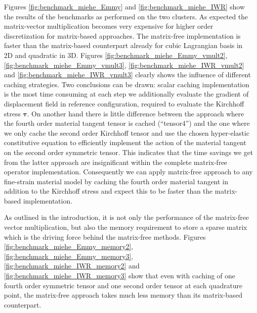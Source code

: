 \documentclass[preprint,12pt,times]{elsarticle}
\def\gz  #1{           \mbox{$\boldsymbol{#1}$}}
\begin{document}
Figures \ref{fig:benchmark_miehe_Emmy} and \ref{fig:benchmark_miehe_IWR} show the results of the benchmarks as performed on the two clusters.
As expected the matrix-vector multiplication becomes very expensive for higher order discretization for matrix-based approaches.
The matrix-free implementation is faster than the matrix-based counterpart already for cubic Lagrangian basis in 2D and quadratic in 3D.
Figures \ref{fig:benchmark_miehe_Emmy_vmult2}, \ref{fig:benchmark_miehe_Emmy_vmult3}, \ref{fig:benchmark_miehe_IWR_vmult2} and \ref{fig:benchmark_miehe_IWR_vmult3} clearly shows the influence of different caching strategies.
Two conclusions can be drawn: scalar caching implementation is the most time consuming at each step we additionally evaluate the gradient of displacement field in reference configuration, required to evaluate the Kirchhoff stress $\gz \tau$. On another hand there is little difference between the approach where the fourth order material tangent tensor is cached (``tensor4'') and the one where we only cache the second order Kirchhoff tensor and use the chosen hyper-elastic constitutive equation to efficiently implement the action of the material tangent on the second order symmetric tensor.
This indicates that the time savings we get from the latter approach are insignificant within the complete matrix-free operator implementation.
Consequently we can apply matrix-free approach to any fine-strain material model by caching the fourth order material tangent in addition to the Kirchhoff stress and expect this to be faster than the matrix-based implementation.

As outlined in the introduction, it is not only the performance of the matrix-free vector multiplication, but also the memory requirement to store a sparse matrix which is the driving force behind the matrix-free methods.
Figures \ref{fig:benchmark_miehe_Emmy_memory2}, \ref{fig:benchmark_miehe_Emmy_memory3}, \ref{fig:benchmark_miehe_IWR_memory2} and \ref{fig:benchmark_miehe_IWR_memory3} show that even with caching of one fourth order symmetric tensor and one second order tensor at each quadrature point, the matrix-free approach takes much less memory than its matrix-based counterpart.
\end{document}
